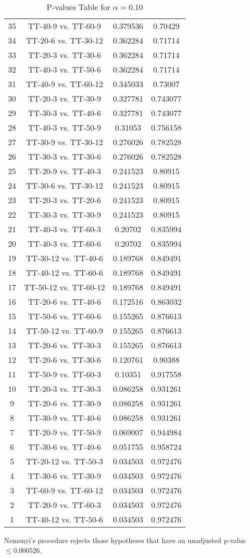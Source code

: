 \documentclass[a4paper,10pt]{article}
\begin{document}
\begin{landscape}
\begin{table}[!htp]
\begin{tabular}{cccc}
35&TT-40-9 vs. TT-60-9&0.379536&0.70429\\
34&TT-20-6 vs. TT-30-12&0.362284&0.71714\\
33&TT-20-3 vs. TT-30-6&0.362284&0.71714\\
32&TT-40-3 vs. TT-50-6&0.362284&0.71714\\
31&TT-40-9 vs. TT-60-12&0.345033&0.73007\\
30&TT-20-3 vs. TT-30-9&0.327781&0.743077\\
29&TT-30-3 vs. TT-40-6&0.327781&0.743077\\
28&TT-40-3 vs. TT-50-9&0.31053&0.756158\\
27&TT-30-9 vs. TT-30-12&0.276026&0.782528\\
26&TT-30-3 vs. TT-30-6&0.276026&0.782528\\
25&TT-20-9 vs. TT-40-3&0.241523&0.80915\\
24&TT-30-6 vs. TT-30-12&0.241523&0.80915\\
23&TT-20-3 vs. TT-20-6&0.241523&0.80915\\
22&TT-30-3 vs. TT-30-9&0.241523&0.80915\\
21&TT-40-3 vs. TT-60-3&0.20702&0.835994\\
20&TT-40-3 vs. TT-60-6&0.20702&0.835994\\
19&TT-30-12 vs. TT-40-6&0.189768&0.849491\\
18&TT-40-12 vs. TT-60-6&0.189768&0.849491\\
17&TT-50-12 vs. TT-60-12&0.189768&0.849491\\
16&TT-20-6 vs. TT-40-6&0.172516&0.863032\\
15&TT-50-6 vs. TT-60-6&0.155265&0.876613\\
14&TT-50-12 vs. TT-60-9&0.155265&0.876613\\
13&TT-20-6 vs. TT-30-3&0.155265&0.876613\\
12&TT-20-6 vs. TT-30-6&0.120761&0.90388\\
11&TT-50-9 vs. TT-60-3&0.10351&0.917558\\
10&TT-20-3 vs. TT-30-3&0.086258&0.931261\\
9&TT-20-6 vs. TT-30-9&0.086258&0.931261\\
8&TT-30-9 vs. TT-40-6&0.086258&0.931261\\
7&TT-20-9 vs. TT-50-9&0.069007&0.944984\\
6&TT-30-6 vs. TT-40-6&0.051755&0.958724\\
5&TT-20-12 vs. TT-50-3&0.034503&0.972476\\
4&TT-30-6 vs. TT-30-9&0.034503&0.972476\\
3&TT-60-9 vs. TT-60-12&0.034503&0.972476\\
2&TT-20-9 vs. TT-60-3&0.034503&0.972476\\
1&TT-40-12 vs. TT-50-6&0.034503&0.972476\\
\hline
\end{tabular}
\caption{P-values Table for $\alpha=0.10$}
\end{table}Nemenyi's procedure rejects those hypotheses that have an unadjusted p-value $\le0.000526$.


\end{landscape}
\end{document}

